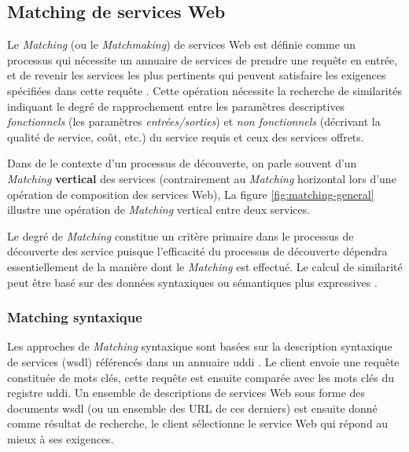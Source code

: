   \subsection{Matching de services Web}
  \label{sec:ws-matching}
  Le \textit{Matching} (ou le \textit{Matchmaking}) de services Web
  est définie comme un processus qui nécessite un annuaire de services
  de prendre une requête en entrée, et de revenir les services les
  plus pertinents qui peuvent satisfaire les exigences spécifiées dans
  cette requête \cite{li2004software}. Cette opération nécessite la
  recherche de similarités indiquant le degré de rapprochement entre
  les paramètres descriptives \textit{fonctionnels} (les paramètres
  \textit{entrées/sorties}) et \textit{non fonctionnels} (décrivant la
  qualité de service, coût, etc.) du service requis et ceux des
  services offrets.

  

  Dans de le contexte d'un processus de découverte, on parle souvent
  d'un \textit{Matching} \textbf{vertical} des services (contrairement
  au \textit{Matching} horizontal lors d'une opération de composition
  des services Web), La figure \ref{fig:matching-general} illustre une
  opération de \textit{Matching} vertical entre deux services.\medskip

  Le degré de \textit{Matching} constitue un critère primaire dans le
  processus de découverte des service puisque l'efficacité du
  processus de découverte dépendra essentiellement de la manière dont
  le \textit{Matching} est effectué. Le calcul de similarité peut être
  basé sur des données syntaxiques ou sémantiques plus expressives
  \cite{elie2010}.

    \subsubsection{Matching syntaxique}
    \label{sec:matching-syntaxique}
    Les approches de \textit{Matching} syntaxique sont basées sur la
    description syntaxique de services (\acrshort{wsdl}) référencés
    dans un annuaire \acrshort{uddi} \cite{clement2004uddi}. Le client
    envoie une requête constituée de mots clés, cette requête est
    ensuite comparée avec les mots clés du registre
    \acrshort{uddi}. Un ensemble de descriptions de services Web sous
    forme des documents \acrshort{wsdl} (ou un ensemble des
    \textsc{URL} de ces derniers) est ensuite donné comme résultat de
    recherche, le client sélectionne le service Web qui répond au
    mieux à ses exigences.\medskip

